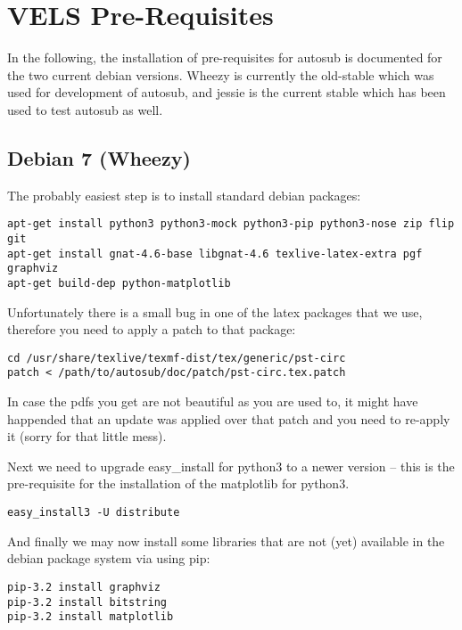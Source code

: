 \section{VELS Pre-Requisites} \label{system_prerequisites}

In the following, the installation of pre-requisites for autosub is documented for 
the two current debian versions. Wheezy is currently the old-stable which was used 
for development of autosub, and jessie is the current stable which has been used to 
test autosub as well.

\subsection{Debian 7 (Wheezy)}

The probably easiest step is to install standard debian packages:

\begin{verbatim}
apt-get install python3 python3-mock python3-pip python3-nose zip flip git
apt-get install gnat-4.6-base libgnat-4.6 texlive-latex-extra pgf graphviz
apt-get build-dep python-matplotlib
\end{verbatim}

Unfortunately there is a small bug in one of the latex packages that we use,
therefore you need to apply a patch to that package:

\begin{verbatim}
cd /usr/share/texlive/texmf-dist/tex/generic/pst-circ
patch < /path/to/autosub/doc/patch/pst-circ.tex.patch
\end{verbatim}

In case the pdfs you get are not beautiful as you are used to, it might have
happended that an update was applied over that patch and you need to re-apply it (sorry for that little mess).


Next we need to upgrade easy\_install for python3 to a newer version -- this
is the pre-requisite for the installation of the matplotlib for python3.

\begin{verbatim}
easy_install3 -U distribute
\end{verbatim}

And finally we may now install some libraries that are not (yet) available in
the debian package system via using pip:

\begin{verbatim}
pip-3.2 install graphviz
pip-3.2 install bitstring
pip-3.2 install matplotlib
\end{verbatim}

